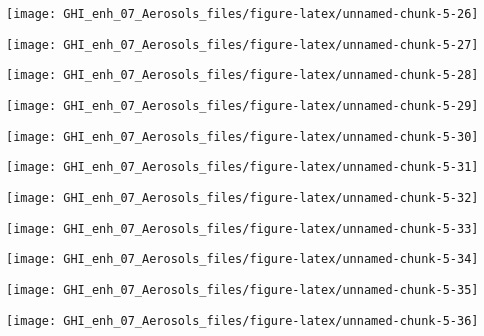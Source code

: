 \documentclass[
  10pt,
  a4paper,oneside]{article}
\begin{document}
\begin{center}\texttt{[image: GHI\_enh\_07\_Aerosols\_files/figure-latex/unnamed-chunk-5-26]} \end{center}

\begin{center}\texttt{[image: GHI\_enh\_07\_Aerosols\_files/figure-latex/unnamed-chunk-5-27]} \end{center}

\begin{center}\texttt{[image: GHI\_enh\_07\_Aerosols\_files/figure-latex/unnamed-chunk-5-28]} \end{center}

\begin{center}\texttt{[image: GHI\_enh\_07\_Aerosols\_files/figure-latex/unnamed-chunk-5-29]} \end{center}

\begin{center}\texttt{[image: GHI\_enh\_07\_Aerosols\_files/figure-latex/unnamed-chunk-5-30]} \end{center}

\begin{center}\texttt{[image: GHI\_enh\_07\_Aerosols\_files/figure-latex/unnamed-chunk-5-31]} \end{center}

\begin{center}\texttt{[image: GHI\_enh\_07\_Aerosols\_files/figure-latex/unnamed-chunk-5-32]} \end{center}

\begin{center}\texttt{[image: GHI\_enh\_07\_Aerosols\_files/figure-latex/unnamed-chunk-5-33]} \end{center}

\begin{center}\texttt{[image: GHI\_enh\_07\_Aerosols\_files/figure-latex/unnamed-chunk-5-34]} \end{center}

\begin{center}\texttt{[image: GHI\_enh\_07\_Aerosols\_files/figure-latex/unnamed-chunk-5-35]} \end{center}

\begin{center}\texttt{[image: GHI\_enh\_07\_Aerosols\_files/figure-latex/unnamed-chunk-5-36]} \end{center}
\end{document}
